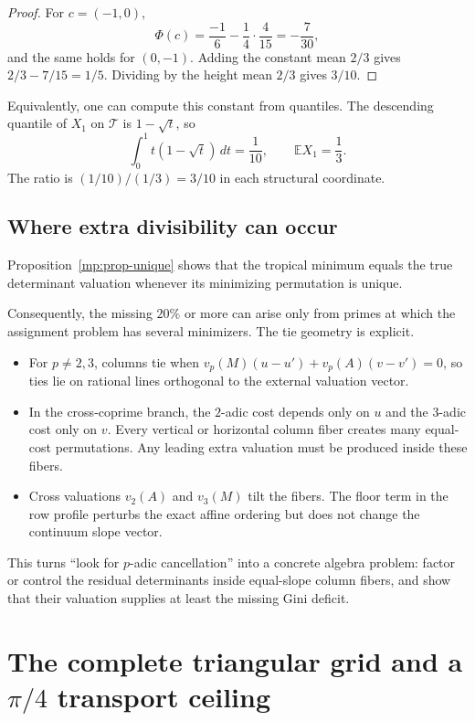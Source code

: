 \documentclass[11pt,oneside]{article}
\theoremstyle{definition}
\theoremstyle{remark}
\newcommand{\DeltaTri}{\mathcal T}
\begin{document}
\begin{proof}
For $c=(-1,0)$,
\[
 \Phi(c)=\frac{-1}{6}-\frac14\cdot\frac4{15}=-\frac7{30},
\]
and the same holds for $(0,-1)$.  Adding the constant mean $2/3$ gives
$2/3-7/15=1/5$.  Dividing by the height mean $2/3$ gives $3/10$.
\end{proof}

Equivalently, one can compute this constant from quantiles.  The descending quantile of
$X_1$ on $\DeltaTri$ is $1-\sqrt t$, so
\[
 \int_0^1t(1-\sqrt t)\,dt=\frac1{10},
 \qquad
 \mathbb EX_1=\frac13.
\]
The ratio is $(1/10)/(1/3)=3/10$ in each structural coordinate.


\subsection{Where extra divisibility can occur}

Proposition~\ref{mp:prop-unique} shows that the tropical minimum equals the true determinant
valuation whenever its minimizing permutation is unique.

Consequently, the missing $20\%$ or more can arise only from primes at which the assignment
problem has several minimizers.  The tie geometry is explicit.

\begin{itemize}
\item For $p\ne2,3$, columns tie when
      $v_p(M)(u-u')+v_p(A)(v-v')=0$, so ties lie on rational lines orthogonal to the external
      valuation vector.
\item In the cross-coprime branch, the $2$-adic cost depends only on $u$ and the $3$-adic cost
      only on $v$.  Every vertical or horizontal column fiber creates many equal-cost
      permutations.  Any leading extra valuation must be produced inside these fibers.
\item Cross valuations $v_2(A)$ and $v_3(M)$ tilt the fibers.  The floor term in the row
      profile perturbs the exact affine ordering but does not change the continuum slope
      vector.
\end{itemize}

This turns ``look for $p$-adic cancellation'' into a concrete algebra problem: factor or
control the residual determinants inside equal-slope column fibers, and show that their
valuation supplies at least the missing Gini deficit.


\section{The complete triangular grid and a \texorpdfstring{$\pi/4$}{pi/4} transport ceiling}
\label{sec:fullgrid}
\end{document}
